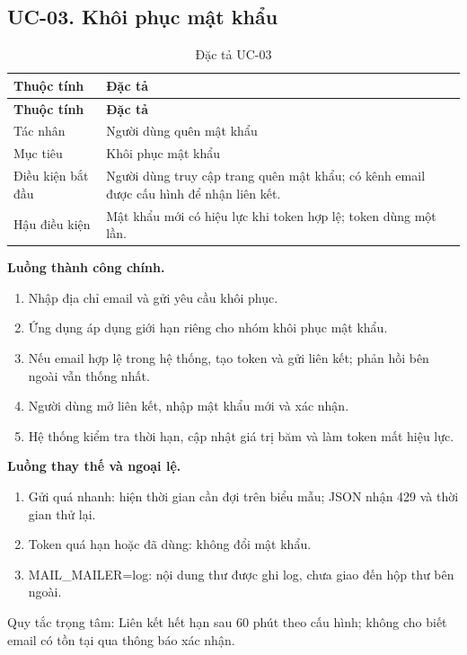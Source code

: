 \clearpage

\subsection{UC-03.\allowbreak{} Khôi phục mật khẩu}
\label{uc:3}

{\small\setlength{\tabcolsep}{3pt}\renewcommand{\arraystretch}{1.12}
\begin{longtable}{@{}L{\textwidth-1.32pt\relax} L{\textwidth-4.68pt\relax}@{}}
\caption{Đặc tả UC-03}\\
\toprule
\textbf{Thuộc tính} & \textbf{Đặc tả}\\\midrule
\endfirsthead
\toprule
\textbf{Thuộc tính} & \textbf{Đặc tả}\\\midrule
\endhead
\bottomrule\endlastfoot
Tác nhân & Người dùng quên mật khẩu\\[3pt]
Mục tiêu & Khôi phục mật khẩu\\[3pt]
Điều kiện bắt đầu & Người dùng truy cập trang quên mật khẩu; có kênh email được cấu hình để nhận liên kết.\allowbreak{}\\[3pt]
Hậu điều kiện & Mật khẩu mới có hiệu lực khi token hợp lệ; token dùng một lần.\allowbreak{}\\[3pt]
\end{longtable}}
\noindent\textbf{Luồng thành công chính.}
\begin{enumerate}
\item Nhập địa chỉ email và gửi yêu cầu khôi phục.\allowbreak{}
\item Ứng dụng áp dụng giới hạn riêng cho nhóm khôi phục mật khẩu.\allowbreak{}
\item Nếu email hợp lệ trong hệ thống, tạo token và gửi liên kết; phản hồi bên ngoài vẫn thống nhất.\allowbreak{}
\item Người dùng mở liên kết, nhập mật khẩu mới và xác nhận.\allowbreak{}
\item Hệ thống kiểm tra thời hạn, cập nhật giá trị băm và làm token mất hiệu lực.\allowbreak{}
\end{enumerate}
\noindent\textbf{Luồng thay thế và ngoại lệ.}
\begin{enumerate}
\item Gửi quá nhanh:\allowbreak{} hiện thời gian cần đợi trên biểu mẫu; JSON nhận 429 và thời gian thử lại.\allowbreak{}
\item Token quá hạn hoặc đã dùng:\allowbreak{} không đổi mật khẩu.\allowbreak{}
\item MAIL\_\allowbreak{}MAILER=log:\allowbreak{} nội dung thư được ghi log, chưa giao đến hộp thư bên ngoài.\allowbreak{}
\end{enumerate}
Quy tắc trọng tâm:\allowbreak{} Liên kết hết hạn sau 60 phút theo cấu hình; không cho biết email có tồn tại qua thông báo xác nhận.\allowbreak{}

